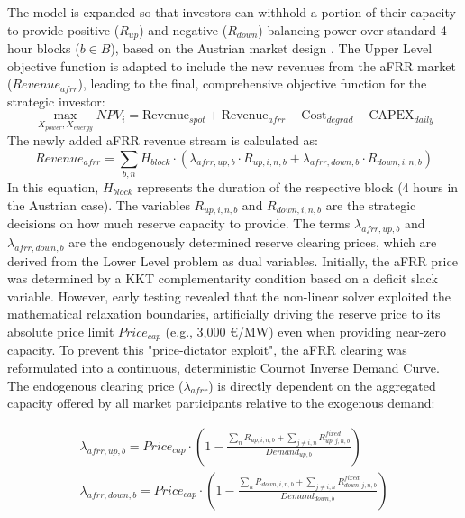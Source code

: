 The model is expanded so that investors can withhold a portion of their capacity to provide positive (\(R_{up}\)) and negative (\(R_{down}\)) balancing power over standard 4-hour blocks (\(b\in B\)), based on the Austrian market design \cite{apg_secondary_control}. The Upper Level objective function is adapted to include the new revenues from the aFRR market (\(Revenue_{afrr}\)), leading to the final, comprehensive objective function for the strategic investor:
\begin{equation}
     \max_{X_{power}, X_{energy}} NPV_{i} = \text{Revenue}_{spot} + \text{Revenue}_{afrr} - \text{Cost}_{degrad} - \text{CAPEX}_{daily}
\end{equation}
The newly added aFRR revenue stream is calculated as:
\begin{equation}
    Revenue_{afrr} = \sum_{b, n} H_{block} \cdot (\lambda_{afrr, up, b} \cdot R_{up, i, n, b} + \lambda_{afrr, down, b} \cdot R_{down, i, n, b})
\end{equation}
In this equation, \(H_{block}\) represents the duration of the respective block (4 hours in the Austrian case). The variables \(R_{up,i,n,b}\) and \(R_{down,i,n,b}\) are the strategic decisions on how much reserve capacity to provide. The terms \(\lambda_{afrr,up,b}\) and \(\lambda_{afrr,down,b}\) are the endogenously determined reserve clearing prices, which are derived from the Lower Level problem as dual variables.
Initially, the aFRR price was determined by a KKT complementarity condition based on a deficit slack variable. However, early testing revealed that the non-linear solver exploited the mathematical relaxation boundaries, artificially driving the reserve price to its absolute price limit \(Price_{cap}\) (e.g., 3,000 €/MW) even when providing near-zero capacity. To prevent this "price-dictator exploit", the aFRR clearing was reformulated into a continuous, deterministic Cournot Inverse Demand Curve. The endogenous clearing price ($\lambda_{afrr}$) is directly dependent on the aggregated capacity offered by all market participants relative to the exogenous demand:

\begin{equation}
    \begin{split}
        \lambda_{afrr, up, b} = Price_{cap} \cdot \left( 1 - \frac{\sum_n R_{up, i, n, b} + \sum_{j \neq i, n} R_{up, j, n, b}^{fixed}}{Demand_{up, b}} \right) \\
        \lambda_{afrr, down, b} = Price_{cap} \cdot \left( 1 - \frac{\sum_n R_{down, i, n, b} + \sum_{j \neq i, n} R_{down, j, n, b}^{fixed}}{Demand_{down, b}} \right)
    \end{split}
\end{equation}

